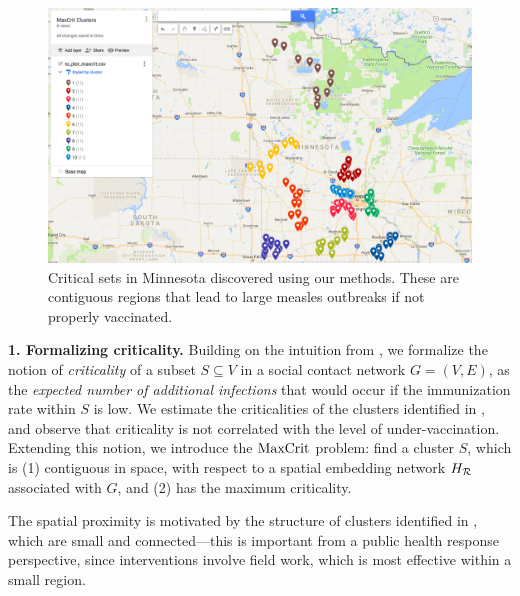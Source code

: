 \begin{figure}
\centering
\includegraphics[width=.45\textwidth]{img/maxcrit_clusters.png}
\caption{Critical sets in Minnesota discovered using our methods. These are contiguous regions that lead to large measles outbreaks if not properly vaccinated.
\vspace*{-0.15in}
}
\label{fig:mn-criticalsets}
\end{figure}
%
\noindent
\textbf{1. Formalizing criticality.}
Building on the intuition from \cite{metcalf:epidemics15}, we formalize the notion of \emph{criticality} of a subset
$S\subseteq V$ in a social contact network $G=(V, E)$, as the \emph{expected number of additional infections} that would occur 
if the immunization rate within $S$ is low. We estimate the criticalities of the clusters identified in \cite{cadena:vacc-cluster},
and observe that criticality is not correlated with the level of under-vaccination.
Extending this notion, we introduce the $\text{MaxCrit}{}$ problem: find a cluster $S$, which is
(1) contiguous in space, with respect to a spatial embedding network $H_{\mathcal{R}}$ associated with $G$, 
and (2) has the maximum criticality.

The spatial proximity is motivated by the structure of clusters identified in 
\cite{lieu2015geographic,atwell:pediatrics13,cadena:vacc-cluster}, which are small and connected---this is important
from a public health response perspective, since interventions involve field work, which is most effective within a small region.



